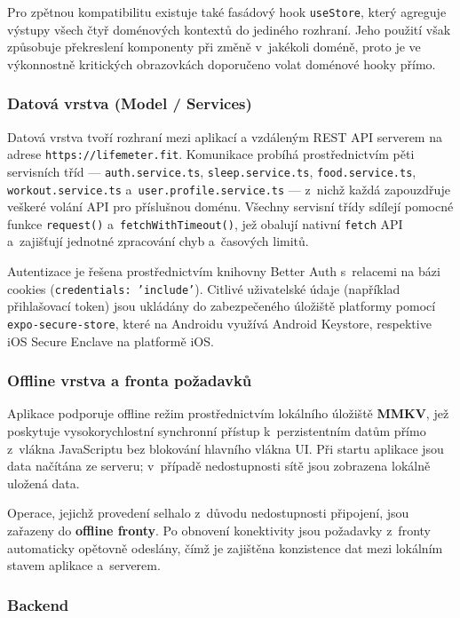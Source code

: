 Pro zpětnou kompatibilitu existuje také fasádový hook \texttt{useStore},
který agreguje výstupy všech čtyř doménových kontextů do jediného
rozhraní. Jeho použití však způsobuje překreslení komponenty při změně
v~jakékoli doméně, proto je ve výkonnostně kritických obrazovkách
doporučeno volat doménové hooky přímo.

\subsubsection*{Datová vrstva (Model / Services)}

Datová vrstva tvoří rozhraní mezi aplikací a vzdáleným REST API
serverem na adrese \texttt{https://lifemeter.fit}. Komunikace probíhá
prostřednictvím pěti servisních tříd — \texttt{auth.service.ts},
\texttt{sleep.service.ts}, \texttt{food.service.ts},
\texttt{workout.service.ts} a~\texttt{user.profile.service.ts} —
z~nichž každá zapouzdřuje veškeré volání API pro příslušnou doménu.
Všechny servisní třídy sdílejí pomocné funkce \texttt{request()}
a~\texttt{fetchWithTimeout()}, jež obalují nativní \texttt{fetch}
API a~zajišťují jednotné zpracování chyb a~časových limitů.

Autentizace je řešena prostřednictvím knihovny Better Auth
s~relacemi na bázi cookies (\texttt{credentials: 'include'}).
Citlivé uživatelské údaje (například přihlašovací token) jsou
ukládány do zabezpečeného úložiště platformy pomocí
\texttt{expo-secure-store}, které na Androidu využívá
Android Keystore, respektive iOS Secure Enclave na platformě iOS.

\subsubsection*{Offline vrstva a fronta požadavků~\cite{androiddev2026offline}}

Aplikace podporuje offline režim prostřednictvím lokálního úložiště
\textbf{MMKV}, jež poskytuje vysokorychlostní synchronní přístup
k~perzistentním datům přímo z~vlákna JavaScriptu bez blokování
hlavního vlákna UI. Při startu aplikace jsou data načítána ze serveru;
v~případě nedostupnosti sítě jsou zobrazena lokálně uložená data.

Operace, jejichž provedení selhalo z~důvodu nedostupnosti připojení,
jsou zařazeny do \textbf{offline fronty}. Po obnovení konektivity
jsou požadavky z~fronty automaticky opětovně odeslány, čímž je
zajištěna konzistence dat mezi lokálním stavem aplikace a~serverem.

\subsubsection*{Backend}

